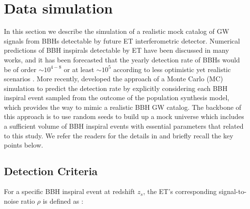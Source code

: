 \documentclass[twocolumn]{aastex62}
\begin{document}
\section{Data simulation} \label{sec_simulation}
In this section we describe the simulation of a realistic mock catalog of GW signals from BBHs detectable by future ET interferometric detector. Numerical predictions of BBH inspirals detectable by ET 
have been discussed in many works, and it has been forecasted that the yearly detection rate of BBHs would be of order $\sim10^{4-8}$ \citep{Abernathy2011} or at least $\sim10^{5}$ according to less optimistic yet realistic scenarios \citep{Ola2013, Biesiada2014}. More recently, \citet{Yang2019} developed the approach of a Monte Carlo (MC) simulation to predict the detection rate by explicitly considering each BBH inspiral event sampled from the outcome of the population synthesis model, which provides the way to mimic a realistic BBH GW catalog. The backbone of this approach is to use random seeds to build up a mock universe which includes a sufficient volume of BBH inspiral events with essential parameters that related to this study. We refer the readers for the details in \citet[][Section 2, therein]{Yang2019}  and briefly recall the key points below.

\subsection{Detection Criteria} \label{subsec_criteria}
For a specific BBH inspiral event at redshift $z_s$, the ET's corresponding signal-to-noise ratio $\rho$ is defined as \citep{Abernathy2011}:
\end{document}
